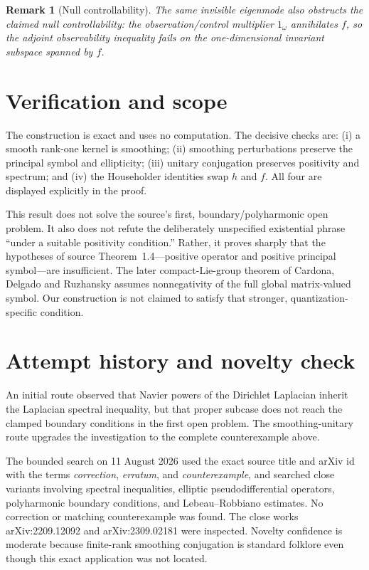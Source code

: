 \documentclass[11pt]{article}
\newtheorem{remark}{Remark}
\begin{document}
\begin{remark}[Null controllability]
The same invisible eigenmode also obstructs the claimed null controllability:
the observation/control multiplier $1_\omega$ annihilates $f$, so the adjoint
observability inequality fails on the one-dimensional invariant subspace
spanned by $f$.
\end{remark}

\section{Verification and scope}

The construction is exact and uses no computation.  The decisive checks are:
(i) a smooth rank-one kernel is smoothing; (ii) smoothing perturbations preserve
the principal symbol and ellipticity; (iii) unitary conjugation preserves
positivity and spectrum; and (iv) the Householder identities swap $h$ and $f$.
All four are displayed explicitly in the proof.

This result does not solve the source's first, boundary/polyharmonic open
problem.  It also does not refute the deliberately unspecified existential
phrase ``under a suitable positivity condition.''  Rather, it proves sharply
that the hypotheses of source Theorem~1.4---positive operator and positive
principal symbol---are insufficient.  The later compact-Lie-group theorem of
Cardona, Delgado and Ruzhansky \cite{CDR2209} assumes nonnegativity of the full
global matrix-valued symbol.  Our construction is not claimed to satisfy that
stronger, quantization-specific condition.

\section{Attempt history and novelty check}

An initial route observed that Navier powers of the Dirichlet Laplacian inherit
the Laplacian spectral inequality, but that proper subcase does not reach the
clamped boundary conditions in the first open problem.  The smoothing-unitary
route upgrades the investigation to the complete counterexample above.

The bounded search on 11 August 2026 used the exact source title and arXiv id
with the terms \emph{correction}, \emph{erratum}, and \emph{counterexample},
and searched close variants involving spectral inequalities, elliptic
pseudodifferential operators, polyharmonic boundary conditions, and
Lebeau--Robbiano estimates.  No correction or matching counterexample was
found.  The close works arXiv:2209.12092 \cite{CDR2209} and arXiv:2309.02181
were inspected.  Novelty confidence is moderate because finite-rank smoothing
conjugation is standard folklore even though this exact application was not
located.
\end{document}
